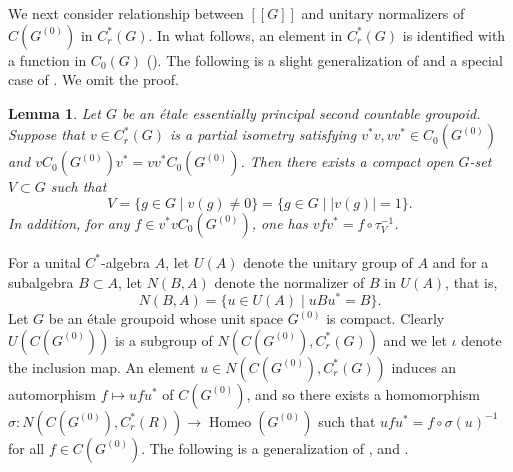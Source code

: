 \documentclass[11pt]{article}
\newtheorem{lem}[thm]{Lemma}
\theoremstyle{definition}
\newcommand{\Homeo}{\operatorname{Homeo}}
\begin{document}
We next consider relationship 
between $[[G]]$ and unitary normalizers of $C(G^{(0)})$ in $C^*_r(G)$. 
In what follows, 
an element in $C^*_r(G)$ is identified with a function in $C_0(G)$ 
(\cite[II.4.2]{R1}). 
The following is a slight generalization of \cite[II.4.10]{R1} and 
a special case of \cite[Proposition 4.7]{R3}. 
We omit the proof. 

\begin{lem}\label{partialisom}
Let $G$ be an \'etale essentially principal second countable groupoid. 
Suppose that $v\in C^*_r(G)$ is a partial isometry satisfying 
$v^*v,vv^*\in C_0(G^{(0)})$ and $vC_0(G^{(0)})v^*=vv^*C_0(G^{(0)})$. 
Then there exists a compact open $G$-set $V\subset G$ such that 
\[
V=\{g\in G\mid v(g)\neq0\}=\{g\in G\mid\lvert v(g)\rvert=1\}. 
\]
In addition, for any $f\in v^*vC_0(G^{(0)})$, 
one has $vfv^*=f\circ\tau_{V}^{-1}$. 
\end{lem}

For a unital $C^*$-algebra $A$, 
let $U(A)$ denote the unitary group of $A$ 
and for a subalgebra $B\subset A$, 
let $N(B,A)$ denote the normalizer of $B$ in $U(A)$, that is, 
\[
N(B,A)=\{u\in U(A)\mid uBu^*=B\}. 
\]
Let $G$ be an \'etale groupoid 
whose unit space $G^{(0)}$ is compact. 
Clearly $U(C(G^{(0)}))$ is a subgroup of $N(C(G^{(0)}),C^*_r(G))$ 
and we let $\iota$ denote the inclusion map. 
An element $u\in N(C(G^{(0)}),C^*_r(G))$ induces an automorphism 
$f\mapsto ufu^*$ of $C(G^{(0)})$, and so 
there exists a homomorphism 
$\sigma:N(C(G^{(0)}),C^*_r(R))\to\Homeo(G^{(0)})$ such that 
$ufu^*=f\circ\sigma(u)^{-1}$ for all $f\in C(G^{(0)})$. 
The following is a generalization of 
\cite[Section 5]{P}, \cite[Theorem 1]{T} and \cite[Theorem 1.2]{Matsu}. 
\end{document}

